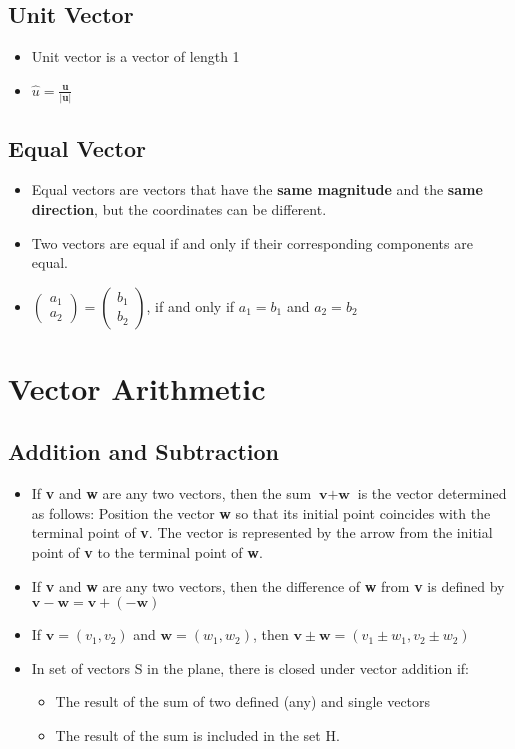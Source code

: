 \documentclass[a4paper,12pt]{article}
\begin{document}
\subsection*{Unit Vector}
\begin{itemize}
  \item Unit vector is a vector of length 1
  \item[] \(\hat{u}=\frac{\textbf{u}}{|\textbf{u}|}\)
\end{itemize}


\subsection*{Equal Vector}
\begin{itemize}
  \item Equal vectors are vectors that have the \textbf{same magnitude} and the \textbf{same direction}, but the coordinates can be different.
  \item Two vectors are equal if and only if their corresponding components are equal.
  \item[] \(\begin{pmatrix} a_1 \\ a_2 \end{pmatrix} = \begin{pmatrix} b_1 \\ b_2 \end{pmatrix}\), if and only if \(a_1 = b_1\) and \(a_2 = b_2\)
\end{itemize}

\section*{Vector Arithmetic}
\subsection*{Addition and Subtraction}
\begin{itemize}
  \item If \textbf{v} and \textbf{w} are any two vectors, then the sum \(\textbf{v} + \textbf{w}\) is the vector determined as follows: Position the vector \textbf{w} so that its initial point coincides with the terminal point of \textbf{v}. The vector is represented by the arrow from the initial point of \textbf{v} to the terminal point of \textbf{w}.
  \item If \textbf{v} and \textbf{w} are any two vectors, then the difference of \textbf{w} from \textbf{v} is defined by \(\textbf{v}-\textbf{w}=\textbf{v}+(-\textbf{w})\)
  \item If \(\textbf{v}=(v_1, v_2)\) and \(\textbf{w}=(w_1, w_2)\), then \(\textbf{v}\pm\textbf{w}=(v_1\pm w_1, v_2\pm w_2)\)
  \item In set of vectors S in the plane, there is closed under vector addition if: \begin{itemize}
          \item The result of the sum of two defined (any) and single vectors
          \item The result of the sum is included in the set H.
        \end{itemize}
\end{itemize}
\end{document}
